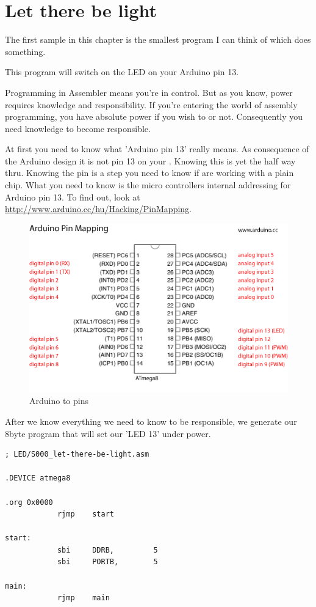 \section{Let there be light}

The first sample in this chapter is the smallest program I can think of which does something.

This program will switch on the LED on your Arduino pin 13.

Programming in Assembler means you're in control. But as you know, power requires knowledge and responsibility. If you're entering the world of assembly programming, you have absolute power if you wish to or not. Consequently you need knowledge to become responsible.

At first you need to know what 'Arduino pin 13' really means. As consequence of the Arduino design it is not pin 13 on your \at. Knowing this is yet the half way thru. Knowing the pin is a step you need to know if are working with a plain chip. What you need to know is the micro controllers internal addressing for Arduino pin 13. To find out, look at \url{http://www.arduino.cc/hu/Hacking/PinMapping}.

\begin{figure}[htbp]
  \centering
  \includegraphics[width=120mm]{Media/www-arduino-cc_Arduino-To-Atmega8-Pins.png}
  \caption{Arduino to \at pins}
  \label{arduino-to-atmega-pins}
\end{figure}

After we know everything we need to know to be responsible, we generate our 8byte program that will set our 'LED 13' under power.

\begin{lstlisting}
; LED/S000_let-there-be-light.asm

.DEVICE atmega8

.org 0x0000
            rjmp    start 

start:
            sbi     DDRB,         5
            sbi     PORTB,        5
            
main:
            rjmp    main
\end{lstlisting}

